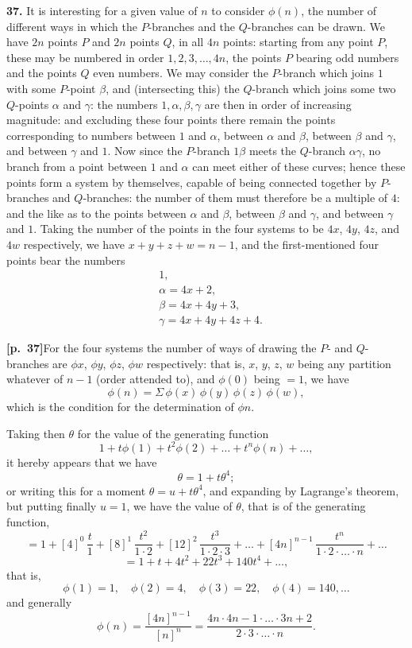 \documentclass[11pt,a4paper]{article}
\begin{document}
\medskip

\noindent\textbf{37.} It is interesting for a given value of $n$ to consider $\phi(n)$, the number of different ways in which the $P$-branches and the $Q$-branches can be drawn. We have $2n$ points $P$ and $2n$ points $Q$, in all $4n$ points: starting from any point $P$, these may be numbered in order $1, 2, 3, \ldots, 4n$, the points $P$ bearing odd numbers and the points $Q$ even numbers. We may consider the $P$-branch which joins $1$ with some $P$-point $\beta$, and (intersecting this) the $Q$-branch which joins some two $Q$-points $\alpha$ and $\gamma$: the numbers $1, \alpha, \beta, \gamma$ are then in order of increasing magnitude: and excluding these four points there remain the points corresponding to numbers between $1$ and $\alpha$, between $\alpha$ and $\beta$, between $\beta$ and $\gamma$, and between $\gamma$ and $1$. Now since the $P$-branch $1\beta$ meets the $Q$-branch $\alpha\gamma$, no branch from a point between $1$ and $\alpha$ can meet either of these curves; hence these points form a system by themselves, capable of being connected together by $P$-branches and $Q$-branches: the number of them must therefore be a multiple of $4$: and the like as to the points between $\alpha$ and $\beta$, between $\beta$ and $\gamma$, and between $\gamma$ and $1$. Taking the number of the points in the four systems to be $4x$, $4y$, $4z$, and $4w$ respectively, we have $x + y + z + w = n - 1$, and the first-mentioned four points bear the numbers
\begin{align*}
& 1, \\
& \alpha = 4x + 2, \\
& \beta = 4x + 4y + 3, \\
& \gamma = 4x + 4y + 4z + 4.
\end{align*}

\bigskip

\noindent\textbf{[p.~37]}\quad For the four systems the number of ways of drawing the $P$- and $Q$-branches are $\phi x$, $\phi y$, $\phi z$, $\phi w$ respectively: that is, $x$, $y$, $z$, $w$ being any partition whatever of $n-1$ (order attended to), and $\phi(0)$ being $=1$, we have
\[
\phi(n) = \Sigma\, \phi(x)\,\phi(y)\,\phi(z)\,\phi(w),
\]
which is the condition for the determination of $\phi n$.

Taking then $\theta$ for the value of the generating function
\[
1 + t\phi(1) + t^{2}\phi(2) + \ldots + t^{n}\phi(n) + \ldots,
\]
it hereby appears that we have
\[
\theta = 1 + t\theta^{4};
\]
or writing this for a moment $\theta = u + t\theta^{4}$, and expanding by Lagrange's theorem, but putting finally $u = 1$, we have the value of $\theta$, that is of the generating function,
\[
= 1 + [4]^{0}\,\frac{t}{1} + [8]^{1}\,\frac{t^{2}}{1\cdot 2} + [12]^{2}\,\frac{t^{3}}{1\cdot 2\cdot 3} + \ldots + [4n]^{n-1}\,\frac{t^{n}}{1\cdot 2\cdot\ldots\cdot n} + \ldots
\]
\[
= 1 + t + 4t^{2} + 22t^{3} + 140t^{4} + \ldots,
\]
that is,
\[
\phi(1) = 1,\quad \phi(2) = 4,\quad \phi(3) = 22,\quad \phi(4) = 140,\ldots
\]
and generally
\[
\phi(n) = \frac{[4n]^{n-1}}{[n]^{n}} = \frac{4n\cdot 4n-1\cdot \ldots \cdot 3n+2}{2\cdot 3\cdot \ldots \cdot n}.
\]
\end{document}
